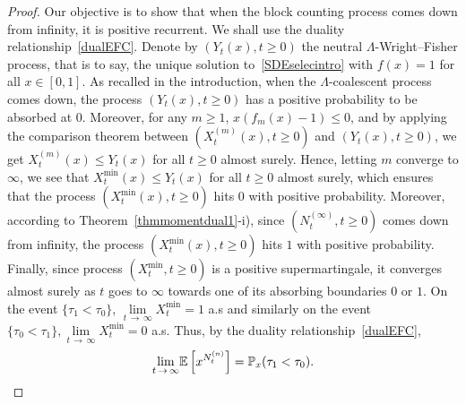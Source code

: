 \documentclass[AHL,Unicode,longabstracts,published]{cedram}
\newcommand{\bbE}{\mathbb{E}}
\newcommand{\bbP}{\mathbb{P}}
\begin{document}
\begin{proof}
 Our objective is to show that when the block counting process comes down from infinity, it is positive recurrent. We shall use the duality relationship~\eqref{dualEFC}. Denote by $(Y_t(x),t\geq 0)$ the neutral $\Lambda$-Wright--Fisher process, that is to say, the unique solution to~\eqref{SDEselecintro} with $f(x)=1$ for all $x\in [0,1]$. As recalled in the introduction, when the $\Lambda$-coalescent process comes down, the process $(Y_t(x),t\geq 0)$ has a positive probability to be absorbed at $0$. Moreover, for any $m\geq 1$, $x(f_m(x)-1)\leq 0$, and by applying the comparison theorem between $(X_t^{(m)}(x),t\geq 0)$ and $(Y_t(x),t\geq 0)$, we get $X_t^{(m)}(x)\leq Y_t(x)$ for all $t\geq 0$ almost surely. Hence, letting $m$ converge to $\infty$, we see that $X^{\min}_t(x)\leq Y_t(x)$ for all $t\geq 0$ almost surely, which ensures that the process $(X^{\min}_t(x),t\geq 0)$ hits $0$ with positive probability. Moreover, according to Theorem~\ref{thmmomentdual1}-i), since $(N_t^{(\infty)},t\geq 0)$ comes down from infinity, the process $(X^{\min}_t(x),t\geq 0)$ hits $1$ with positive probability. Finally, since process $(X_t^{\min},t\geq 0)$ is a positive supermartingale, it converges almost surely as $t$ goes to $\infty$ towards one of its absorbing boundaries $0$ or $1$. On the event $\{\tau_1<\tau_0\}$, $\underset{t\,\rightarrow\,\infty}{\lim} X_t^{\min}=1$ a.s and similarly on the event 
$
\{\tau_0<\tau_1\}, \underset{t\,\rightarrow \,\infty}{\lim} X_t^{\min}=0
$
a.s. Thus, by the duality relationship~\eqref{dualEFC},
\[ 
\underset{t\,\rightarrow\,\infty}{\lim} \bbE\left[x^{N_t^{(n)}}\right]=\bbP_x(\tau_1<\tau_0).\qedhere
\]
\end{proof}
\end{document}
